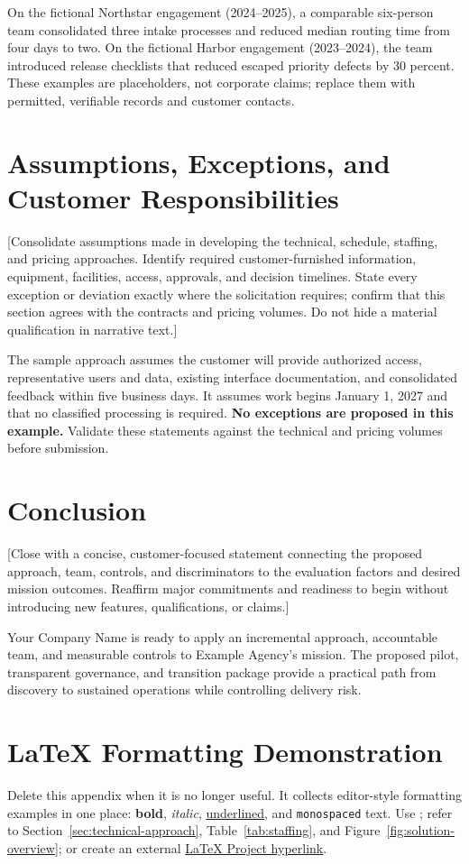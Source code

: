 On the fictional Northstar engagement (2024--2025), a comparable six-person
team consolidated three intake processes and reduced median routing time from
four days to two. On the fictional Harbor engagement (2023--2024), the team
introduced release checklists that reduced escaped priority defects by 30
percent. These examples are placeholders, not corporate claims; replace them
with permitted, verifiable records and customer contacts.

\section{Assumptions, Exceptions, and Customer Responsibilities}
\label{sec:assumptions}
[Consolidate assumptions made in developing the technical, schedule, staffing,
and pricing approaches. Identify required customer-furnished information,
equipment, facilities, access, approvals, and decision timelines. State every
exception or deviation exactly where the solicitation requires; confirm that
this section agrees with the contracts and pricing volumes. Do not hide a
material qualification in narrative text.]

The sample approach assumes the customer will provide authorized access,
representative users and data, existing interface documentation, and consolidated
feedback within five business days. It assumes work begins January 1, 2027 and
that no classified processing is required. \textbf{No exceptions are proposed
in this example.} Validate these statements against the technical and pricing
volumes before submission.

\section{Conclusion}
\label{sec:conclusion}
[Close with a concise, customer-focused statement connecting the proposed
approach, team, controls, and discriminators to the evaluation factors and
desired mission outcomes. Reaffirm major commitments and readiness to begin
without introducing new features, qualifications, or claims.]

Your Company Name is ready to apply an incremental approach, accountable team,
and measurable controls to Example Agency's mission. The proposed pilot,
transparent governance, and transition package provide a practical path from
discovery to sustained operations while controlling delivery risk.

\appendix
\section{LaTeX Formatting Demonstration}
\label{sec:formatting-demo}
Delete this appendix when it is no longer useful. It collects editor-style
formatting examples in one place: \textbf{bold}, \emph{italic},
\underline{underlined}, and \texttt{monospaced} text. Use ; refer to Section~\ref{sec:technical-approach},
Table~\ref{tab:staffing}, and Figure~\ref{fig:solution-overview}; or create an
external \href{https://www.latex-project.org/}{LaTeX Project hyperlink}.

